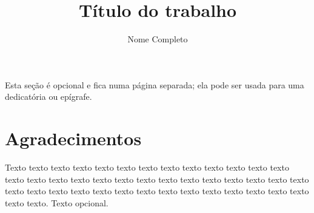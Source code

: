 \documentclass[a4paper,12pt,twoside,english,brazilian]{book}
\title{Título do trabalho}[um subtítulo]
\author[fem]{Nome Completo}
\begin{document}

\frontmatter

\pagestyle{plain}

\onehalfspacing %

\maketitle %


\begin{dedicatoria}
Esta seção é opcional e fica numa página separada; ela pode ser usada para
uma dedicatória ou epígrafe.
\end{dedicatoria}


\chapter*{Agradecimentos}

Texto texto texto texto texto texto texto texto texto texto texto texto texto
texto texto texto texto texto texto texto texto texto texto texto texto texto
texto texto texto texto texto texto texto texto texto texto texto texto texto
texto texto texto texto. Texto opcional.




\end{document}
